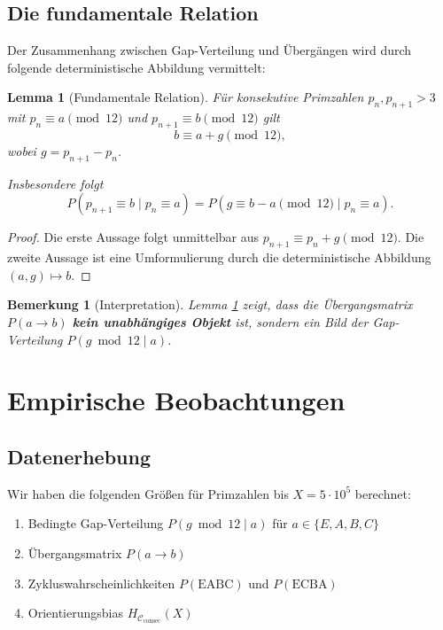 \documentclass[11pt,a4paper]{article}
\newtheorem{lemma}[theorem]{Lemma}
\newtheorem{remark}[theorem]{Bemerkung}
\begin{document}
\subsection{Die fundamentale Relation}

Der Zusammenhang zwischen Gap-Verteilung und Übergängen wird durch folgende deterministische Abbildung vermittelt:

\begin{lemma}[Fundamentale Relation]
\label{lem:fundamental}
Für konsekutive Primzahlen $p_n, p_{n+1} > 3$ mit $p_n \equiv a \pmod{12}$ und $p_{n+1} \equiv b \pmod{12}$ gilt
\[
b \equiv a + g \pmod{12},
\]
wobei $g = p_{n+1} - p_n$.

Insbesondere folgt
\[
P(p_{n+1} \equiv b \mid p_n \equiv a) = P(g \equiv b - a \pmod{12} \mid p_n \equiv a).
\]
\end{lemma}

\begin{proof}
Die erste Aussage folgt unmittelbar aus $p_{n+1} \equiv p_n + g \pmod{12}$. Die zweite Aussage ist eine Umformulierung durch die deterministische Abbildung $(a, g) \mapsto b$.
\end{proof}

\begin{remark}[Interpretation]
Lemma \ref{lem:fundamental} zeigt, dass die Übergangsmatrix $P(a \to b)$ \textbf{kein unabhängiges Objekt} ist, sondern ein Bild der Gap-Verteilung $P(g \bmod 12 \mid a)$.
\end{remark}

\section{Empirische Beobachtungen}

\subsection{Datenerhebung}

Wir haben die folgenden Größen für Primzahlen bis $X = 5 \cdot 10^5$ berechnet:

\begin{enumerate}
\item Bedingte Gap-Verteilung $P(g \bmod 12 \mid a)$ für $a \in \{E, A, B, C\}$
\item Übergangsmatrix $P(a \to b)$
\item Zykluswahrscheinlichkeiten $P(\text{EABC})$ und $P(\text{ECBA})$
\item Orientierungsbias $H_{\mathcal{C}_{\text{consec}}}(X)$
\end{enumerate}
\end{document}
